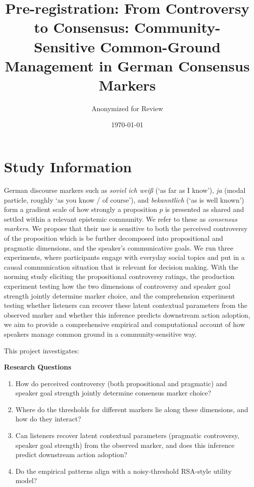 \documentclass[12pt]{article}
\title{Pre-registration: From Controversy to Consensus: Community-Sensitive Common-Ground Management in German Consensus Markers}
\author{Anonymized for Review}
\date{\today}
\begin{document}
\maketitle

\section{Study Information}

German discourse markers such as \textit{soviel ich wei\ss} (`as far as I know'), \textit{ja} (modal particle, roughly `as you know / of course'), and \textit{bekanntlich} (`as is well known') form a gradient scale of how strongly a proposition $p$ is presented as shared and settled within a relevant epistemic community. We refer to these as \emph{consensus markers}. We propose that their use is sensitive to both the perceived controversy of the proposition which is be further decomposed into propositional and pragmatic dimensions, and the speaker's communicative goals. We run three experiments, where participants engage with everyday social topics and put in a causal communication situation that is relevant for decision making. With the norming study eliciting the propositional controversy ratings, the production experiment testing how the two dimensions of controversy and speaker goal strength jointly determine marker choice, and the comprehension experiment testing whether listeners can recover these latent contextual parameters from the observed marker and whether this inference predicts downstream action adoption, we aim to provide a comprehensive empirical and computational account of how speakers manage common ground in a community-sensitive way.

This project investigates:

\textbf{Research Questions}
\begin{enumerate}
    \item How do perceived controversy (both propositional and pragmatic) and speaker goal strength jointly determine consensus marker choice?
    \item Where do the thresholds for different markers lie along these dimensions, and how do they interact?
    \item Can listeners recover latent contextual parameters (pragmatic controversy, speaker goal strength) from the observed marker, and does this inference predict downstream action adoption?
    \item Do the empirical patterns align with a noisy-threshold RSA-style utility model?
\end{enumerate}
\end{document}
